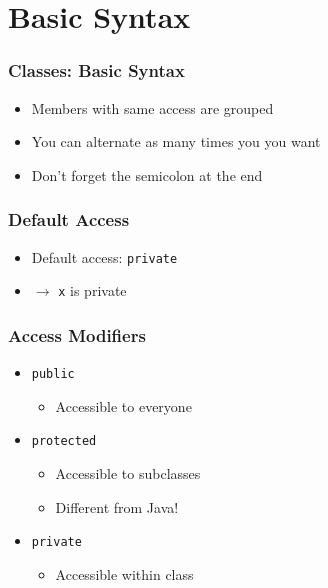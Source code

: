 \section{Basic Syntax}
\frame{\tableofcontents[currentsection]}

\begin{frame}
  \frametitle{Classes: Basic Syntax}
  \begin{overprint}
    \begin{itemize}
      \item Members with same access are grouped
      \item You can alternate as many times you you want
    \end{itemize}
    
    \begin{itemize}
      \item Don't forget the semicolon at the end
    \end{itemize}
  \end{overprint}
\end{frame}

\begin{frame}
  \frametitle{Default Access}
  \begin{itemize}
    \item Default access: \texttt{private}
    \item $\rightarrow$ \texttt{x} is private
  \end{itemize}
\end{frame}

\begin{frame}
  \frametitle{Access Modifiers}
  \begin{itemize}
    \item \texttt{public}
          \begin{itemize}
            \item Accessible to everyone
          \end{itemize}
    \item \texttt{protected}
          \begin{itemize}
            \item Accessible to subclasses
            \item Different from Java!
          \end{itemize}
    \item \texttt{private}
          \begin{itemize}
            \item Accessible within class
          \end{itemize}
  \end{itemize}
\end{frame}

